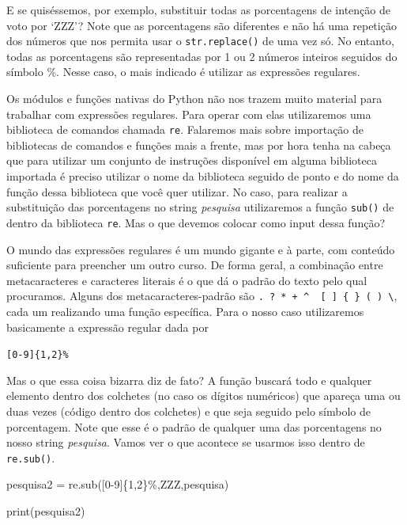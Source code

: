 \documentclass[
  brazilian,
  letterpaper,
  DIV=11,
  numbers=noendperiod]{scrreprt}
\newenvironment{Shaded}{\begin{snugshade}}{\end{snugshade}}
\newcommand{\BuiltInTok}[1]{\textcolor[rgb]{0.00,0.23,0.31}{#1}}
\newcommand{\NormalTok}[1]{\textcolor[rgb]{0.00,0.23,0.31}{#1}}
\newcommand{\OperatorTok}[1]{\textcolor[rgb]{0.37,0.37,0.37}{#1}}
\newcommand{\StringTok}[1]{\textcolor[rgb]{0.13,0.47,0.30}{#1}}
\begin{document}
E se quiséssemos, por exemplo, substituir todas as porcentagens de
intenção de voto por `ZZZ'? Note que as porcentagens são diferentes e
não há uma repetição dos números que nos permita usar o
\texttt{str.replace()} de uma vez só. No entanto, todas as porcentagens
são representadas por 1 ou 2 números inteiros seguidos do símbolo
\(\%\). Nesse caso, o mais indicado é utilizar as expressões regulares.

Os módulos e funções nativas do Python não nos trazem muito material
para trabalhar com expressões regulares. Para operar com elas
utilizaremos uma biblioteca de comandos chamada \texttt{re}. Falaremos
mais sobre importação de bibliotecas de comandos e funções mais a
frente, mas por hora tenha na cabeça que para utilizar um conjunto de
instruções disponível em alguma biblioteca importada é preciso utilizar
o nome da biblioteca seguido de ponto e do nome da função dessa
biblioteca que você quer utilizar. No caso, para realizar a substituição
das porcentagens no string \emph{pesquisa} utilizaremos a função
\texttt{sub()} de dentro da biblioteca \texttt{re}. Mas o que devemos
colocar como input dessa função?

O mundo das expressões regulares é um mundo gigante e à parte, com
conteúdo suficiente para preencher um outro curso. De forma geral, a
combinação entre metacaracteres e caracteres literais é o que dá o
padrão do texto pelo qual procuramos. Alguns dos metacaracteres-padrão
são
\texttt{.\ ?\ *\ +\ \^{}\ \textbar{}\ {[}\ {]}\ \{\ \}\ (\ )\ \textbackslash{}},
cada um realizando uma função específica. Para o nosso caso utilizaremos
basicamente a expressão regular dada por

\texttt{{[}0-9{]}\{1,2\}\%}

Mas o que essa coisa bizarra diz de fato? A função buscará todo e
qualquer elemento dentro dos colchetes (no caso os dígitos numéricos)
que apareça uma ou duas vezes (código dentro dos colchetes) e que seja
seguido pelo símbolo de porcentagem. Note que esse é o padrão de
qualquer uma das porcentagens no nosso string \emph{pesquisa}. Vamos ver
o que acontece se usarmos isso dentro de \texttt{re.sub()}.

\begin{Shaded}
\begin{Highlighting}[]
\NormalTok{pesquisa2 }\OperatorTok{=}\NormalTok{ re.sub(}\StringTok{\textquotesingle{}[0{-}9]\{1,2\}\%\textquotesingle{}}\NormalTok{,}\StringTok{\textquotesingle{}ZZZ\textquotesingle{}}\NormalTok{,pesquisa)}

\BuiltInTok{print}\NormalTok{(pesquisa2)}
\end{Highlighting}
\end{Shaded}
\end{document}
